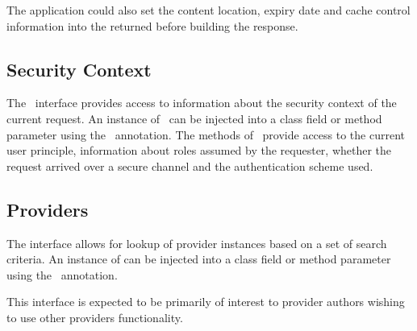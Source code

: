The application could also set the content location, expiry date and cache control information into the returned  before building the response.

\subsection{Security Context}

The \SecurityContext\ interface provides access to information about the security context of the current request. An instance of \SecurityContext\ can be injected into a class field or method parameter using the \Context\ annotation. The methods of \SecurityContext\ provide access to the current user principle, information about roles assumed by the requester, whether the request arrived over a secure channel and the authentication scheme used.

\subsection{Providers}
\label{providercontext}

The  interface allows for lookup of provider instances based on a set of search criteria. An instance of  can be injected into a class field or method parameter using the \Context\ annotation.

This interface is expected to be primarily of interest to provider authors wishing to use other providers functionality.
